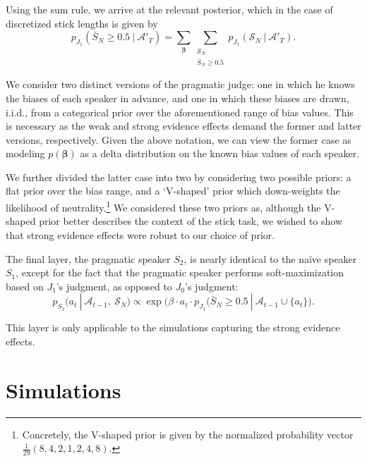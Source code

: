 \documentclass[10pt,letterpaper]{article}
\begin{document}
Using the sum rule, we arrive at the relevant posterior, which in the case of discretized stick lengths is given by
\begin{equation}
	p_{J_1} ( \bar{S}_N \ge 0.5 \ | \ \mathcal{A}'_T ) = \sum_{\bm{\beta}} \sum_{\substack{\mathcal{S}_N \\ \bar{S}_N \ge 0.5}} p_{J_1} (\mathcal{S}_N \ | \ \mathcal{A}'_T).
\end{equation}

We consider two distinct versions of the pragmatic judge: one in which he knows the biases of each speaker in advance, and
one in which these biases are drawn, i.i.d., from a categorical prior over the aforementioned range of bias values. This is 
necessary as the weak and strong evidence effects demand the former and latter versions, respectively. Given the above notation,
we can view the former case as modeling $p(\bm{\beta})$ as a delta distribution on the known bias values of each speaker.

We further divided the latter case into two by considering two possible priors: a flat prior over the bias range, and a `V-shaped' prior which down-weights 
the likelihood of neutrality.\footnote{Concretely, the V-shaped prior is given by the normalized probability vector $\frac{1}{29} (8, 4, 2, 1, 2, 4, 8)$.} 
We considered these two priors as, although the V-shaped prior better describes the context of the stick task, we wished to show 
that strong evidence effects were robust to our choice of prior.

The final layer, the pragmatic speaker $S_2$, is nearly identical to the na\"ive speaker $S_1$, except for the fact that
the pragmatic speaker performs soft-maximization based on $J_1$'s judgment, as opposed to $J_0$'s judgment:
\begin{equation}
	p_{S_2} (a_t \ | \ \mathcal{A}_{t-1},\ \mathcal{S}_N) \propto \exp \bigl(\beta \cdot a_t \cdot p_{J_1} (\bar{S}_N \ge 0.5 \ | \ \mathcal{A}_{t-1} \cup \{a_t\} \bigr).
\end{equation}

This layer is only applicable to the simulations capturing the strong evidence effects.

\section{Simulations}
\end{document}

